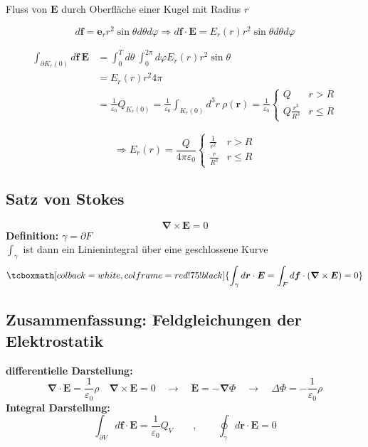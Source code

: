 \documentclass[titlepage,11pt,a4paper,ngerman]{report}
\renewcommand{\Phi}{\varPhi}
\newcommand{\intt}[2]{\int_{#1}^{#2}}
\renewcommand{\vec}[1]{\boldsymbol{#1}}
\renewcommand{\epsilon}{\varepsilon}
\newcommand{\rmbox}[1]{\tcboxmath[colback=white,colframe=red!75!black]{#1}}
\begin{document}
Fluss von $\vec{E}$ durch Oberfläche einer Kugel mit Radius $r$




$$d \vec{f} = \vec{e}_r r^2 \sin \theta d \theta d \varphi \Rightarrow d \vec{f} \cdot \vec{E} = E_r(r)r^2\sin \theta d \theta d \varphi $$

\begin{align*}
\int_{\partial K_r (0)} d\vec{f}\ \vec{E} &= \int_0^T d \theta \ \intt{0}{2 \pi} d \varphi E_r (r) r^2 \sin \theta\\
&= E_r (r) r^2 4 \pi\\
&= \frac{1}{\epsilon_0} Q_{K_r (0)} = \frac{1}{\epsilon_0} \int_{K_r (0)} d^3 r\ \rho(\vec{r}) = \frac{1}{\epsilon_0} \left\{ \begin{array}{cc}
Q & r > R\\
Q \frac{r^3}{R^3} & r \leq R 		
\end{array}\right.
\end{align*}

$$\Rightarrow E_r(r) = \frac{Q}{4 \pi \epsilon_0}\left\{ \begin{array}{cc}
\frac{1}{r^2} & r > R\\
\frac{r}{R^3} & r \leq R 		
\end{array}\right.$$






\subsection{Satz von Stokes}
\begin{equation*}
\vec{\nabla} \times \vec{E} = 0
\end{equation*}
\textbf{Definition:} $ \gamma = \partial F $\\
$ \int_\gamma $ ist dann ein Linienintegral über eine geschlossene Kurve
\begin{equation*}
\rmbox{\int_\gamma d \vec{r} \cdot \vec{E} = \int_F d\vec{f} \cdot (\vec{\nabla} \times \vec{E}) = 0}
\end{equation*}

\subsection{Zusammenfassung: Feldgleichungen der Elektrostatik}

\textbf{differentielle Darstellung:}
\begin{equation*}
\vec{\nabla}\cdot \vec{E} = \frac{1}{\epsilon_0} \rho \quad \vec{\nabla} \times \vec{E} = 0 \quad \rightarrow \quad \vec{E} = - \vec{\nabla} \Phi \quad \rightarrow \quad \Delta \Phi = - \frac{1}{\epsilon_0} \rho
\end{equation*}
\textbf{Integral Darstellung:}
\begin{equation*}
\int_{\partial V} d\vec{f} \cdot \vec{E} = \frac{1}{\epsilon_0} Q_V \qquad , \qquad \oint_\gamma d\vec{r} \cdot \vec{E} = 0
\end{equation*}
\end{document}
